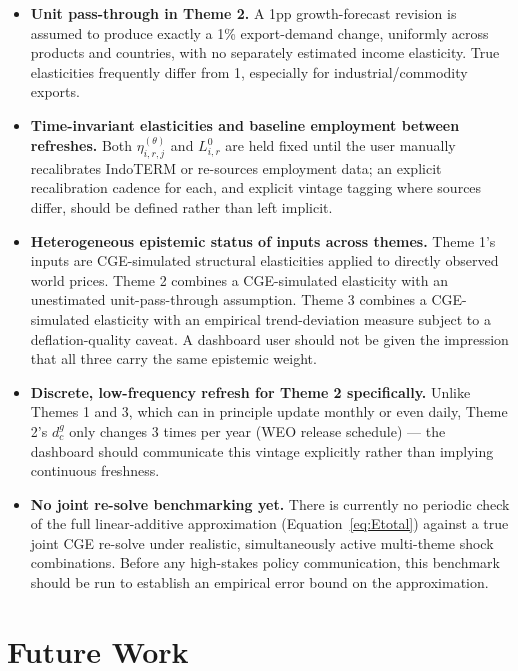 \documentclass[11pt]{article}
\begin{document}
\begin{itemize}
  \item \textbf{Unit pass-through in Theme 2.} A 1pp growth-forecast revision
  is assumed to produce exactly a 1\% export-demand change, uniformly across
  products and countries, with no separately estimated income elasticity.
  True elasticities frequently differ from 1, especially for
  industrial/commodity exports.
  \item \textbf{Time-invariant elasticities and baseline employment between
  refreshes.} Both $\eta^{(\theta)}_{i,r,j}$ and $L_{i,r}^0$ are held fixed
  until the user manually recalibrates IndoTERM or re-sources employment
  data; an explicit recalibration cadence for each, and explicit vintage
  tagging where sources differ, should be defined rather than left implicit.
  \item \textbf{Heterogeneous epistemic status of inputs across themes.}
  Theme 1's inputs are CGE-simulated structural elasticities applied to
  directly observed world prices. Theme 2 combines a CGE-simulated
  elasticity with an unestimated unit-pass-through assumption. Theme 3
  combines a CGE-simulated elasticity with an empirical trend-deviation
  measure subject to a deflation-quality caveat. A dashboard user should not
  be given the impression that all three carry the same epistemic weight.
  \item \textbf{Discrete, low-frequency refresh for Theme 2 specifically.}
  Unlike Themes 1 and 3, which can in principle update monthly or even
  daily, Theme 2's $d^g_c$ only changes 3 times per year (WEO release
  schedule) --- the dashboard should communicate this vintage explicitly
  rather than implying continuous freshness.
  \item \textbf{No joint re-solve benchmarking yet.} There is currently no
  periodic check of the full linear-additive approximation
  (Equation~\eqref{eq:Etotal}) against a true joint CGE re-solve under
  realistic, simultaneously active multi-theme shock combinations. Before
  any high-stakes policy communication, this benchmark should be run to
  establish an empirical error bound on the approximation.
\end{itemize}

\section{Future Work}
\label{sec:future}
\end{document}
